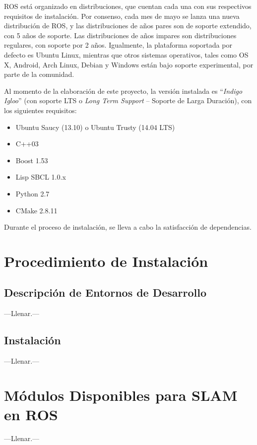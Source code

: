 ROS está organizado en distribuciones, que cuentan cada una con sus respectivos requisitos de instalación. Por consenso, cada mes de mayo se lanza una nueva distribución de ROS, y las distribuciones de años pares son de soporte extendido, con 5 años de soporte. Las distribuciones de años impares son distribuciones regulares, con soporte por 2 años. Igualmente, la plataforma soportada por defecto es Ubuntu Linux, mientras que otros sistemas operativos, tales como OS X, Android, Arch Linux, Debian y Windows están bajo soporte experimental, por parte de la comunidad.

Al momento de la elaboración de este proyecto, la versión instalada es ``\textit{Indigo Igloo}'' (con soporte LTS o \textit{Long Term Support} -- Soporte de Larga Duración), con los siguientes requisitos:

\begin{itemize}
	\itemsep1pt \parskip1pt 
	\item Ubuntu Saucy (13.10) o Ubuntu Trusty (14.04 LTS)
	\item C++03
	\item Boost 1.53
	\item Lisp SBCL 1.0.x
	\item Python 2.7
	\item CMake 2.8.11 \cite{rosrequirements}
\end{itemize}

Durante el proceso de instalación, se lleva a cabo la satisfacción de dependencias.

\section{Procedimiento de Instalación}

\subsection{Descripción de Entornos de Desarrollo}

---Llenar.---

\subsection{Instalación}

---Llenar.---

\section{Módulos Disponibles para SLAM en ROS}

---Llenar.---